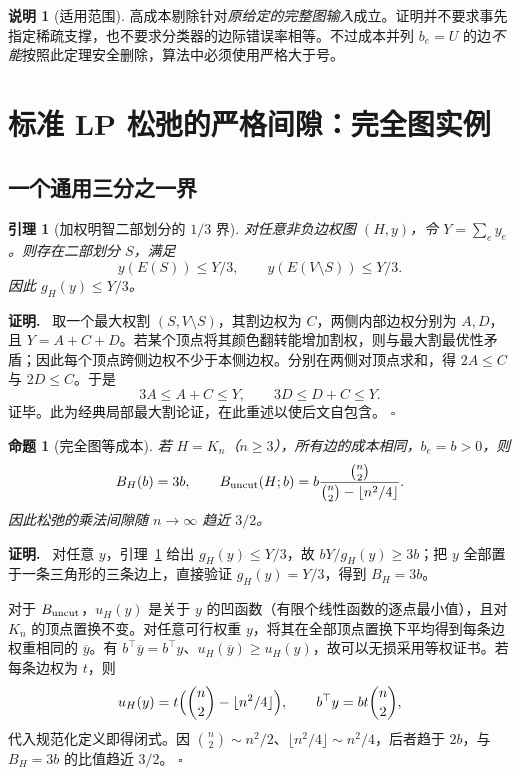 \documentclass[11pt,a4paper]{ctexart}
\newtheorem{lemma}[theorem]{引理}
\newtheorem{proposition}[theorem]{命题}
\theoremstyle{definition}
\newtheorem{remark}[theorem]{说明}
\newenvironment{proofcn}{\par\noindent\textbf{证明.}\ }{\hfill$\square$\par}
\newcommand{\1}{\boldsymbol 1}
\begin{document}
\begin{remark}[适用范围]
高成本剔除针对\emph{原给定的完整图输入}成立。证明并不要求事先指定稀疏支撑，也不要求分类器的边际错误率相等。不过成本并列 $b_e=U$ 的边\emph{不能}按照此定理安全删除，算法中必须使用严格大于号。
\end{remark}

\section{标准 LP 松弛的严格间隙：完全图实例}
\subsection{一个通用三分之一界}
\begin{lemma}[加权明智二部划分的 $1/3$ 界]\label{lem:third}
对任意非负边权图 $(H,y)$，令 $Y=\sum_e y_e$。则存在二部划分 $S$，满足
\[
 y(E(S))\le Y/3,\qquad y(E(V\setminus S))\le Y/3.
\]
因此 $g_H(y)\le Y/3$。
\end{lemma}
\begin{proofcn}
取一个最大权割 $(S,V\setminus S)$，其割边权为 $C$，两侧内部边权分别为 $A,D$，且 $Y=A+C+D$。若某个顶点将其颜色翻转能增加割权，则与最大割最优性矛盾；因此每个顶点跨侧边权不少于本侧边权。分别在两侧对顶点求和，得 $2A\le C$ 与 $2D\le C$。于是
\[
 3A\le A+C\le Y,
 \qquad3D\le D+C\le Y.
\]
证毕。此为经典局部最大割论证\cite{BollobasScott2002,AlonEtAl2003}，在此重述以使后文自包含。
\end{proofcn}

\begin{proposition}[完全图等成本]\label{prop:homogeneous}
若 $H=K_n$（$n\ge3$），所有边的成本相同，$b_e=b>0$，则
\[
 B_H(b)=3b,
 \qquad
 B_{\rm uncut}(H;b)
 =b\frac{\binom n2}{\binom n2-\lfloor n^2/4\rfloor}.
\]
因此松弛的乘法间隙随 $n\to\infty$ 趋近 $3/2$。
\end{proposition}
\begin{proofcn}
对任意 $y$，引理~\ref{lem:third} 给出 $g_H(y)\le Y/3$，故 $bY/g_H(y)\ge3b$；把 $y$ 全部置于一条三角形的三条边上，直接验证 $g_H(y)=Y/3$，得到 $B_H=3b$。

对于 $B_{\rm uncut}$，$u_H(y)$ 是关于 $y$ 的凹函数（有限个线性函数的逐点最小值），且对 $K_n$ 的顶点置换不变。对任意可行权重 $y$，将其在全部顶点置换下平均得到每条边权重相同的 $\overline y$。有 $b^\top\overline y=b^\top y$、$u_H(\overline y)\ge u_H(y)$，故可以无损采用等权证书。若每条边权为 $t$，则
\[
 u_H(y)=t\Bigl(\binom n2-\lfloor n^2/4\rfloor\Bigr),\qquad
 b^\top y=bt\binom n2,
\]
代入规范化定义即得闭式。因 $\binom n2\sim n^2/2$、$\lfloor n^2/4\rfloor\sim n^2/4$，后者趋于 $2b$，与 $B_H=3b$ 的比值趋近 $3/2$。
\end{proofcn}
\end{document}
